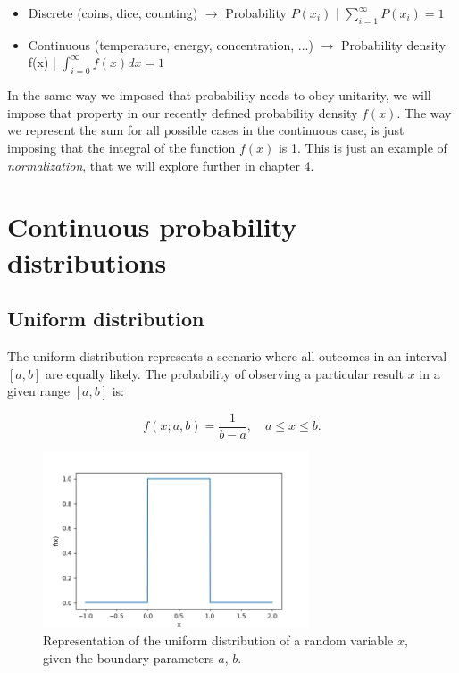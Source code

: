 \documentclass{book}
\begin{document}
\begin{itemize}
\item Discrete (coins, dice, counting) $\longrightarrow$ Probability $P(x_{i})$ | $\sum_{i = 1}^{\infty} P(x_{i}) = 1$
\item Continuous (temperature, energy, concentration, ...) $\longrightarrow$ Probability density f(x) | $\int_{i = 0}^{\infty} f(x) dx = 1$
\end{itemize}

In the same way we imposed that probability needs to obey unitarity, we will impose that property in our recently defined probability density $f(x)$. The way we represent the sum for all possible cases in the continuous case, is just imposing that the integral of the function $f(x)$ is 1. This is just an example of \textit{normalization}, that we will explore further in chapter 4.

\newpage

\section{Continuous probability distributions}

\subsection{Uniform distribution}

The uniform distribution represents a scenario where all outcomes in an interval $[a, b]$ are equally likely. The probability of observing a particular result $x$ in a given range $[a, b]$ is:

\begin{equation}
    f(x; a, b) = \frac{1}{b-a}, \quad a \leq x \leq b.
\end{equation}

\begin{figure}[ht]
    \centering
    \includegraphics[width=0.7\textwidth]{figures/chapter2/uniform.png}
    \caption{Representation of the uniform distribution of a random variable $x$, given the boundary parameters $a$, $b$.}
    \label{fig:uniform1}
\end{figure}
\end{document}
